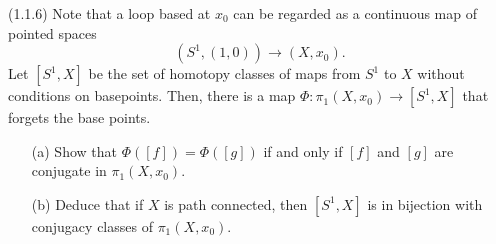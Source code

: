 \documentclass[12pt]{article}
\begin{document}
\begin{problem}{4}
(1.1.6) Note that a loop based at \( x_0 \) can be regarded as a continuous map of pointed spaces
\[
(S^1, (1, 0)) \to (X, x_0).
\]
Let \( [S^1, X] \) be the set of homotopy classes of maps from \( S^1 \) to \( X \) without conditions on basepoints. Then, there is a map \( \Phi : \pi_1(X, x_0) \to [S^1, X] \) that forgets the base points.
\begin{itemize}
    \item[(a)] Show that \( \Phi([f]) = \Phi([g]) \) if and only if \( [f] \) and \( [g] \) are conjugate in \( \pi_1(X, x_0) \).
    \item[(b)] Deduce that if \( X \) is path connected, then \( [S^1, X] \) is in bijection with conjugacy classes of \( \pi_1(X, x_0) \).
\end{itemize}
\end{problem}
\end{document}
